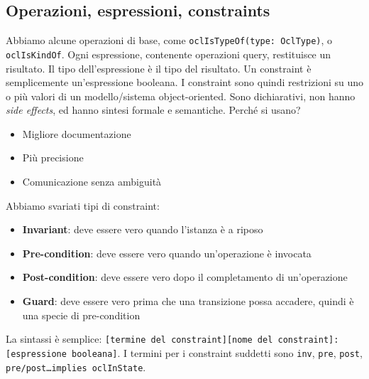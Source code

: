 \documentclass[11pt]{article}
\newcommand{\code}[1]{\texttt{#1}}
\begin{document}
\subsection{Operazioni, espressioni, constraints}
Abbiamo alcune operazioni di base, come \code{oclIsTypeOf(type: OclType)}, o \code{oclIsKindOf}. Ogni espressione, contenente operazioni query, restituisce un risultato. Il tipo dell'espressione è il tipo del risultato. Un constraint è semplicemente un'espressione booleana. 
I constraint sono quindi restrizioni su uno o più valori di un modello/sistema object-oriented. Sono dichiarativi, non hanno \textit{side effects}, ed hanno sintesi formale e semantiche. Perché si usano?
\begin{itemize}
    \item Migliore documentazione
    \item Più precisione
    \item Comunicazione senza ambiguità
\end{itemize}
Abbiamo svariati tipi di constraint:
\begin{itemize}
    \item \textbf{Invariant}: deve essere vero quando l'istanza è a riposo
    \item \textbf{Pre-condition}: deve essere vero quando un'operazione è invocata
    \item \textbf{Post-condition}: deve essere vero dopo il completamento di un'operazione
    \item \textbf{Guard}: deve essere vero prima che una transizione possa accadere, quindi è una specie di pre-condition
\end{itemize}
La sintassi è semplice: \code{[termine del constraint][nome del constraint]:[espressione booleana]}. I termini per i constraint suddetti sono \code{inv}, \code{pre}, \code{post}, \code{pre/post…implies oclInState}.




\printglossary
\end{document}
